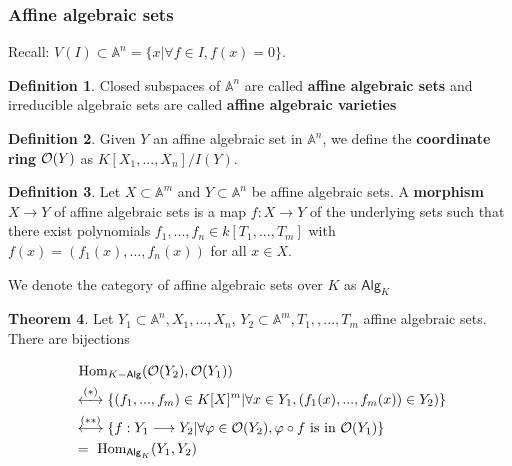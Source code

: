 \documentclass[11pt]{article}
\theoremstyle{definition}
\newtheorem{thm}{Theorem}[section]
\newtheorem{dfn}[thm]{Definition}
\renewcommand{\hom}{\text{ Hom}}
\newcommand{\affn}{\mathbb A}
\newcommand{\calo}{{\cal O}}
\newcommand{\lrta}{\longrightarrow}
\newcommand{\llrta}{\longleftrightarrow}
\begin{document}
\subsubsection{Affine algebraic sets}
Recall: $V(I)\subset \affn^n =\{x|\forall f\in I, f(x)=0\}$.
\begin{dfn}
Closed subspaces of $\affn^n$ are called \textbf{affine algebraic sets} and irreducible algebraic sets are called \textbf{affine algebraic varieties}
\end{dfn}
\begin{dfn}
Given $Y$ an affine algebraic set in $\affn^n$, we define the \textbf{coordinate ring} $\calo(Y)$ as $K[X_1,...,X_n]/I(Y)$.
\end{dfn}
\begin{dfn}
Let $X\subset \affn^m$ and $Y \subset \affn^n$ be affine algebraic sets. A \textbf{morphism} $X \lrta Y$ of affine algebraic sets is a map $f : X \lrta Y$ of the underlying sets such that there exist polynomials $f_1,...,f_n \in k[T_1,...,T_m]$ with $f(x) = (f_1(x),...,f_n(x))$ for all $x\in X$. 
\end{dfn}
We denote the category of affine algebraic sets over $K$ as $\mathsf{Alg}_K$
\begin{thm}\label{thm:equivalence_of_categories_algebraic_sets_K_algebras}
Let $Y_1\subset \affn^n, X_1,...,X_n$, $Y_2\subset \affn^m, T_1,,..., T_m$ affine algebraic sets. There are bijections 

$$
\begin{aligned}
&\hom_{K\mathsf{-Alg}}(\calo(Y_2),\calo(Y_1))
\\
&\overset{(*)}{\llrta}\{(f_1,...,f_m)\in K[X]^m|\forall x\in Y_1,(f_1(x),...,f_m(x))\in Y_2) \}\\
&\overset{(**)}{\llrta} \{f:Y_1\lrta Y_2|\forall \varphi\in \calo(Y_2),\varphi\circ f\text{ is  in }  \calo(Y_1)\}\\
&=\hom_{\mathsf{Alg}_K}(Y_1,Y_2)
\end{aligned}
$$
\end{thm}
\end{document}
